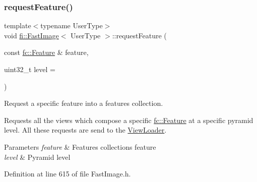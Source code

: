 \subsubsection{\texorpdfstring{request\+Feature()}{requestFeature()}}
{\footnotesize\ttfamily template$<$typename User\+Type$>$ \\
void \hyperlink{classfi_1_1FastImage}{fi\+::\+Fast\+Image}$<$ User\+Type $>$\+::request\+Feature (\begin{DoxyParamCaption}\item[{const \hyperlink{classfc_1_1Feature}{fc\+::\+Feature} \&}]{feature,  }\item[{uint32\+\_\+t}]{level = {} }\end{DoxyParamCaption})\hspace{0.3cm}{\ttfamily [inline]}}



Request a specific feature into a features collection. 

Requests all the views which compose a specific \hyperlink{classfc_1_1Feature}{fc\+::\+Feature} at a specific pyramid level. All these requests are send to the \hyperlink{classfi_1_1ViewLoader}{View\+Loader}. 
\begin{DoxyParams}{Parameters}
{\em feature} & Features collection\textquotesingle{}s feature \\
\hline
{\em level} & Pyramid level \\
\hline
\end{DoxyParams}


Definition at line 615 of file Fast\+Image.\+h.


